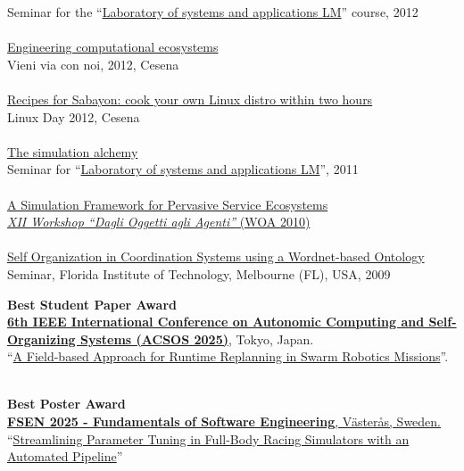 \documentclass[10pt]{article}
\renewcommand{\section}[2]%
        {\pagebreak[3]\vspace{1.3\baselineskip}%
         \phantomsection\addcontentsline{toc}{section}{#1}%
         \hspace{0in}%
         \marginpar{
         \raggedright \scshape #1}#2}
\newcommand{\halfblankline}{\quad\vspace{-0.5\baselineskip}\pagebreak[3]}
\begin{document}
Seminar for the ``\href{http://apice.unibo.it/xwiki/bin/view/Courses/LsaLm1213}{Laboratory of systems and applications LM}'' course, 2012
\\ \halfblankline \\
\href{https://www.slideshare.net/DanySK/engineering-computational-ecosystems}{Engineering computational ecosystems} \\
Vieni via con noi, 2012, Cesena
\\ \halfblankline \\
\href{https://www.slideshare.net/DanySK/recipes-for-sabayon-cook-your-own-linux-distro-within-two-hours}{Recipes for Sabayon: cook your own Linux distro within two hours} \\
Linux Day 2012, Cesena
\\ \halfblankline \\
\href{http://campus.unibo.it/83921/}{The simulation alchemy} \\
Seminar for ``\href{http://apice.unibo.it/xwiki/bin/view/Courses/LsaLm1112}{Laboratory of systems and applications LM}'', 2011
\\ \halfblankline \\
\href{http://apice.unibo.it/xwiki/bin/view/Talks/PianiniWoa2011}{A Simulation Framework for Pervasive Service Ecosystems} \\
\href{http://www.inf.u-szeged.hu/projectdirs/saso10/}{\textit{XII Workshop ``Dagli Oggetti agli Agenti''} (WOA 2010)}
\\ \halfblankline \\
\href{}{Self Organization in Coordination Systems using a Wordnet-based Ontology} \\
Seminar, Florida Institute of Technology, Melbourne (FL), USA, 2009

\section{Awards}
\textbf{Best Student Paper Award}\\
\href{https://2025.acsos.org/}{\textbf{6th IEEE International Conference on Autonomic Computing and Self-Organizing Systems (ACSOS 2025)}}, Tokyo, Japan.\\
``\href{https://www.es.mdh.se/pdf_publications/7224.pdf}{A Field-based Approach for Runtime Replanning in Swarm Robotics Missions}''.

\halfblankline\\
\textbf{Best Poster Award}\\
\href{https://conf.researchr.org/home/fsen-2025}{
  \textbf{FSEN 2025 - Fundamentals of Software Engineering},
    Västerås, Sweden.
}\\
``\href{https://github.com/DanySK/poster-2025-fsen-parameter-tuning-pipeline/raw/master/PosterDelta.pdf}{Streamlining Parameter Tuning in Full-Body Racing Simulators with an Automated Pipeline}''
\end{document}
